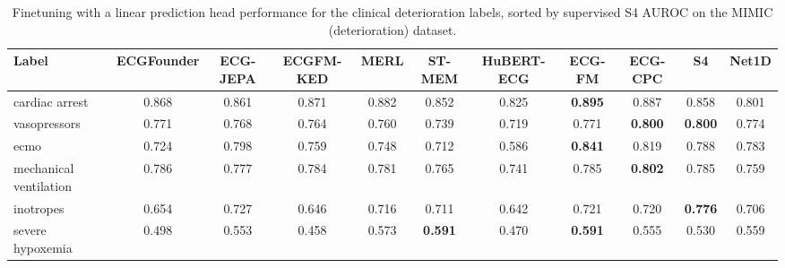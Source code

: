 \documentclass{article}
\begin{document}
                \begin{table}[htbp]
                    \centering
                    \tiny
                    \setlength{\tabcolsep}{2pt}
                    \caption{Finetuning with a linear prediction head performance for the clinical deterioration labels, sorted by supervised S4 AUROC on the MIMIC (deterioration) dataset.}
                    \begin{tabular}{lcccccccccc}
                        \toprule
                        \textbf{Label} & \textbf{ECGFounder} & \textbf{ECG-JEPA} & \textbf{ECGFM-KED} & \textbf{MERL} & \textbf{ST-MEM} & \textbf{HuBERT-ECG} & \textbf{ECG-FM} & \textbf{ECG-CPC} & \textbf{S4} & \textbf{Net1D} \\
                        \midrule
                        cardiac arrest & 0.868 & 0.861 & 0.871 & 0.882 & 0.852 & 0.825 & \textbf{0.895} & 0.887 & 0.858 & 0.801 \\
                        vasopressors & 0.771 & 0.768 & 0.764 & 0.760 & 0.739 & 0.719 & 0.771 & \textbf{0.800} & \textbf{0.800} & 0.774 \\
                        ecmo & 0.724 & 0.798 & 0.759 & 0.748 & 0.712 & 0.586 & \textbf{0.841} & 0.819 & 0.788 & 0.783 \\
                        mechanical ventilation & 0.786 & 0.777 & 0.784 & 0.781 & 0.765 & 0.741 & 0.785 & \textbf{0.802} & 0.785 & 0.759 \\
                        inotropes & 0.654 & 0.727 & 0.646 & 0.716 & 0.711 & 0.642 & 0.721 & 0.720 & \textbf{0.776} & 0.706 \\
                        severe hypoxemia & 0.498 & 0.553 & 0.458 & 0.573 & \textbf{0.591} & 0.470 & \textbf{0.591} & 0.555 & 0.530 & 0.559 \\
                        \bottomrule
                    \end{tabular}
                    \label{tab:results_overview_deterioration}
                \end{table}
\end{document}
